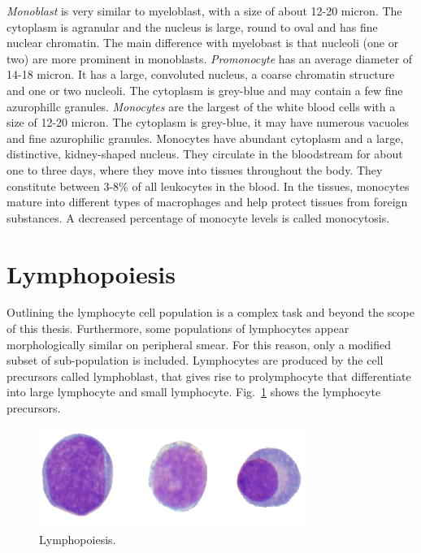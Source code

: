 \documentclass[final,a4paper,12pt,english]{UnicaPhdThesis3}
\begin{document}
\textit{Monoblast} is very similar to myeloblast, with a size of about 12-20 micron. The cytoplasm is agranular and the nucleus is large, round to oval and has fine nuclear chromatin. The main difference with myelobast is that nucleoli (one or two) are more prominent in monoblasts. \textit{Promonocyte} has an average diameter of 14-18 micron. It has a large, convoluted nucleus, a coarse chromatin structure and one or two nucleoli. The cytoplasm is grey-blue and may contain a few fine azurophillc granules. \textit{Monocytes} are the largest of the white blood cells with a size of 12-20 micron. The cytoplasm is grey-blue, it may have numerous vacuoles and fine azurophilic granules. Monocytes have abundant cytoplasm and a large, distinctive, kidney-shaped nucleus. They circulate in the bloodstream for about one to three days, where they move into tissues throughout the body. They constitute between 3-8\% of all leukocytes in the blood. In the tissues, monocytes mature into different types of macrophages and help protect tissues from foreign substances. A decreased percentage of monocyte levels is called monocytosis.

\section{Lymphopoiesis}
Outlining the lymphocyte cell population is a complex task and beyond the scope of this thesis. Furthermore, some populations of lymphocytes appear morphologically similar on peripheral smear. For this reason, only a modified subset of sub-population is included. Lymphocytes are produced by the cell precursors called lymphoblast, that gives rise to prolymphocyte that differentiate into large lymphocyte and small lymphocyte.
Fig.~\ref{fig:Lymphopoiesis} shows the lymphocyte precursors.

\begin{figure}[!htbp]
\centering
\includegraphics[width=0.78\textwidth]{images/lymphopoiesis}
\caption{\label{fig:Lymphopoiesis} Lymphopoiesis.}
\end{figure}
\end{document}
